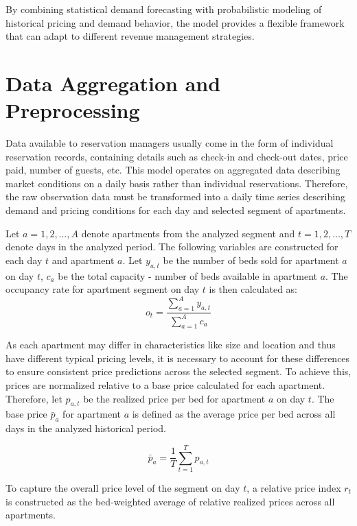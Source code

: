 By combining statistical demand forecasting with probabilistic modeling of historical pricing and demand behavior, the model provides a flexible framework that can adapt to different revenue management strategies.
\section{Data Aggregation and Preprocessing}
Data available to reservation managers usually come in the form of individual reservation records, containing details such as check-in and check-out dates, price paid, number of guests, etc. This model operates on aggregated data describing market conditions on a daily basis rather than individual reservations. Therefore, the raw observation data must be transformed into a daily time series describing demand and pricing conditions for each day and selected segment of apartments.

Let $a = 1, 2, \ldots, A$ denote apartments from the analyzed segment and $t = 1, 2, \ldots, T$ denote days in the analyzed period. The following variables are constructed for each day $t$ and apartment $a$. Let $y_{a,t}$ be the number of beds sold for apartment $a$ on day $t$, $c_a$ be the total capacity - number of beds available in apartment $a$. The occupancy rate for apartment segment on day $t$ is then calculated as:
\begin{equation}
    o_t = \frac{\sum_{a=1}^A y_{a,t}}{\sum_{a=1}^A c_a}
\end{equation}

As each apartment may differ in characteristics like size and location and thus have different typical pricing levels, it is necessary to account for these differences to ensure consistent price predictions across the selected segment. To achieve this, prices are normalized relative to a base price calculated for each apartment. Therefore, let $p_{a,t}$ be the realized price per bed for apartment $a$ on day $t$. The base price  $\bar{p}_a$ for apartment $a$ is defined as the average price per bed across all days in the analyzed historical period.

\begin{equation}
    \bar{p}_a = \frac{1}{T} \sum_{t=1}^T p_{a,t}
\end{equation}

To capture the overall price level of the segment on day $t$, a relative price index $r_t$ is constructed as the bed-weighted average of relative realized prices across all apartments.

